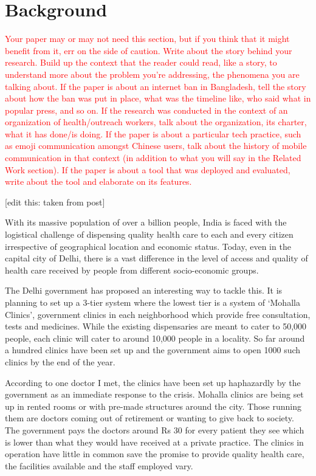 \section{Background}
\textcolor{red}{Your paper may or may not need this section, but if you think that it might benefit from it, err on the side of caution. Write about the story behind your research. Build up the context that the reader could read, like a story, to understand more about the problem you’re addressing, the phenomena you are talking about. If the paper is about an internet ban in Bangladesh, tell the story about how the ban was put in place, what was the timeline like, who said what in popular press, and so on. If the research was conducted in the context of an organization of health/outreach workers, talk about the organization, its charter, what it has done/is doing. If the paper is about a particular tech practice, such as emoji communication amongst Chinese users, talk about the history of mobile communication in that context (in addition to what you will say in the Related Work section). If the paper is about a tool that was deployed and evaluated, write about the tool and elaborate on its features.}

[edit this: taken from post]

With its massive population of over a billion people, India is faced with the logistical challenge of dispensing quality health care to each and every citizen irrespective of geographical location and economic status. Today, even in the capital city of Delhi, there is a vast difference in the level of access and quality of health care received by people from different socio-economic groups.

The Delhi government has proposed an interesting way to tackle this. It is planning to set up a 3-tier system where the lowest tier is a system of ‘Mohalla Clinics’, government clinics in each neighborhood which provide free consultation, tests and medicines. While the existing dispensaries are meant to cater to 50,000 people, each clinic will cater to around 10,000 people in a locality. So far around a hundred clinics have been set up and the government aims to open 1000 such clinics by the end of the year.

According to one doctor I met, the clinics have been set up haphazardly by the government as an immediate response to the crisis. Mohalla clinics are being set up in rented rooms or with pre-made structures around the city. Those running them are doctors coming out of retirement or wanting to give back to society. The government pays the doctors around Rs 30 for every patient they see which is lower than what they would have received at a private practice. The clinics in operation have little in common save the promise to provide quality health care, the facilities available and the staff employed vary.


